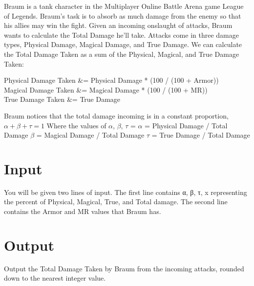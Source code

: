 
Braum is a tank character in the Multiplayer Online Battle Arena game League of Legends. Braum’s task is to absorb as much damage from the enemy so that his allies may win the fight.
Given an incoming onslaught of attacks, Braum wants to calculate the Total Damage he’ll take.
Attacks come in three damage types, Physical Damage, Magical Damage, and True Damage.
We can calculate the Total Damage Taken as a sum of the Physical, Magical, and True Damage Taken:
\begin{center}
	Physical Damage Taken &= 	Physical Damage * (100 / (100 + Armor)) \\
	Magical Damage Taken  &= 	Magical Damage * (100 / (100 + MR)) \\
	True Damage Taken 	&= 	True Damage \\
\end{center}
Braum notices that the total damage incoming is in a constant proportion, $\alpha + \beta + \tau = 1$
Where the values of $\alpha$, $\beta$, $\tau$ =
$\alpha$ = Physical Damage / Total Damage
$\beta$ = Magical Damage / Total Damage
$\tau$ = True Damage / Total Damage

\section*{Input}
You will be given two lines of input. The first line contains α, β, τ, x representing the percent of Physical, Magical, True, and Total damage. The second line contains the Armor and MR values that Braum has.

\section*{Output}
Output the Total Damage Taken by Braum from the incoming attacks, rounded down to the nearest integer value.
